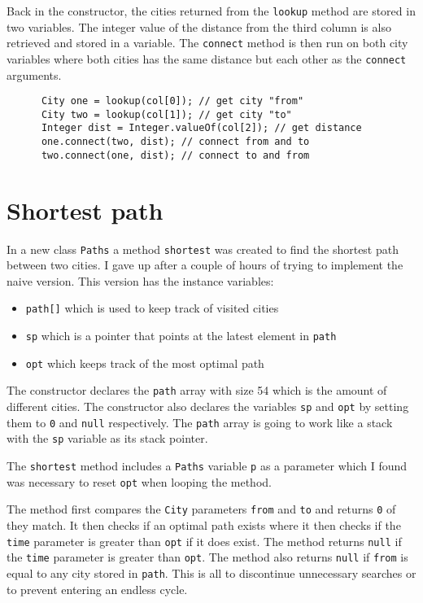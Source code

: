 \documentclass[a4paper,11pt]{article}
\begin{document}
Back in the constructor, the cities returned from the {\tt lookup} method
are stored in two variables. The integer value of the distance from the 
third column is also retrieved and stored in a variable. The {\tt connect}
method is then run on both city variables where both cities has the same 
distance but each other as the {\tt connect} arguments. 

\begin{verbatim}
      City one = lookup(col[0]); // get city "from"
      City two = lookup(col[1]); // get city "to"
      Integer dist = Integer.valueOf(col[2]); // get distance
      one.connect(two, dist); // connect from and to
      two.connect(one, dist); // connect to and from
\end{verbatim}

\section*{Shortest path}

In a new class {\tt Paths} a method {\tt shortest} was created to find the 
shortest path between two cities. I gave up after a couple of hours of 
trying to implement the naive version. This version has the instance 
variables:
\begin{itemize}
  \item {\tt path[]} which is used to keep track of visited cities
  \item {\tt sp} which is a pointer that points at the latest element in {\tt path}
  \item {\tt opt} which keeps track of the most optimal path
\end{itemize}
The constructor declares the {\tt path} array with size 54 which is the 
amount of different cities. The constructor also declares the variables
{\tt sp} and {\tt opt} by setting them to {\tt 0} and {\tt null} 
respectively. The {\tt path} array is going to work like a stack with the 
{\tt sp} variable as its stack pointer.

The {\tt shortest} method includes a {\tt Paths} variable {\tt p} as a 
parameter which I found was necessary to reset {\tt opt} when looping the 
method.

The method first compares the {\tt City} parameters {\tt from} and {\tt to}
and returns {\tt 0} of they match. It then checks if an optimal path exists 
where it then checks if the {\tt time} parameter is greater than {\tt opt} 
if it does exist. The method returns {\tt null} if the {\tt time} parameter 
is greater than {\tt opt}. The method also returns {\tt null} if {\tt from}
is equal to any city stored in {\tt path}. This is all to discontinue 
unnecessary searches or to prevent entering an endless cycle.
\end{document}

